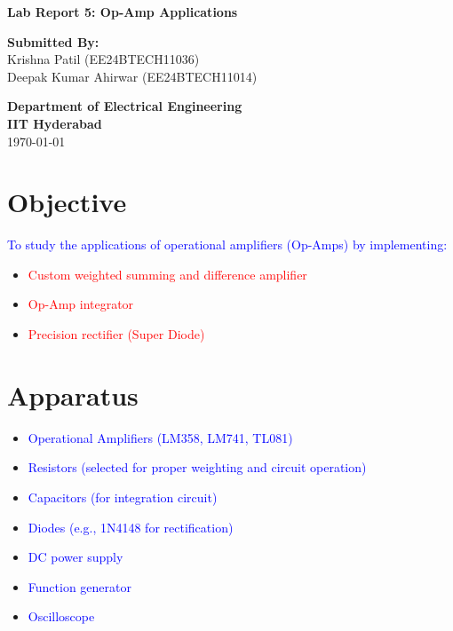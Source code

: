 \documentclass[a4paper,12pt]{article}
\begin{document}
\begin{titlepage}
    \centering
    \vspace*{1cm}
    \Huge \textbf{Lab Report 5: Op-Amp Applications}
    \vspace{1.5cm}
    
    \LARGE \textbf{Submitted By:}\\
    \Large Krishna Patil (EE24BTECH11036)\\
    Deepak Kumar Ahirwar (EE24BTECH11014)
    
    \vfill
    
    \Large \textbf{Department of Electrical Engineering}\\
    \Large \textbf{IIT Hyderabad}\\
    \Large \today
    
    \vspace*{2cm}
\end{titlepage}

\section*{Objective}
\textcolor{blue}{To study the applications of operational amplifiers (Op-Amps) by implementing:}
\begin{itemize}
    \item \textcolor{red}{Custom weighted summing and difference amplifier}
    \item \textcolor{red}{Op-Amp integrator}
    \item \textcolor{red}{Precision rectifier (Super Diode)}
\end{itemize}

\section*{Apparatus}
\begin{itemize}
    \item \textcolor{blue}{Operational Amplifiers (LM358, LM741, TL081)}
    \item \textcolor{blue}{Resistors (selected for proper weighting and circuit operation)}
    \item \textcolor{blue}{Capacitors (for integration circuit)}
    \item \textcolor{blue}{Diodes (e.g., 1N4148 for rectification)}
    \item \textcolor{blue}{DC power supply}
    \item \textcolor{blue}{Function generator}
    \item \textcolor{blue}{Oscilloscope}
\end{itemize}
\end{document}
